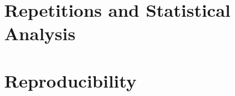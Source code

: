 \section{Repetitions and Statistical Analysis}
\label{sec:repetitions_and_statistics}

\section{Reproducibility}
\label{sec:reproducibility}
